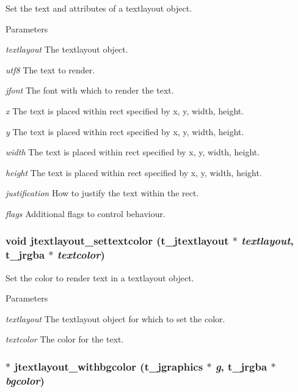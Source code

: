 Set the text and attributes of a textlayout object. 
\begin{DoxyParams}{Parameters}
\item[{\em textlayout}]The textlayout object. \item[{\em utf8}]The text to render. \item[{\em jfont}]The font with which to render the text. \item[{\em x}]The text is placed within rect specified by x, y, width, height. \item[{\em y}]The text is placed within rect specified by x, y, width, height. \item[{\em width}]The text is placed within rect specified by x, y, width, height. \item[{\em height}]The text is placed within rect specified by x, y, width, height. \item[{\em justification}]How to justify the text within the rect. \item[{\em flags}]Additional flags to control behaviour. \end{DoxyParams}
\hypertarget{group__textlayout_ga73ef3d6927ae63816be07cd3314db191}{
\subsubsection[{jtextlayout\_\-settextcolor}]{\setlength{\rightskip}{0pt plus 5cm}void jtextlayout\_\-settextcolor ({\bf t\_\-jtextlayout} $\ast$ {\em textlayout}, \/  {\bf t\_\-jrgba} $\ast$ {\em textcolor})}}
\label{group__textlayout_ga73ef3d6927ae63816be07cd3314db191}


Set the color to render text in a textlayout object. 
\begin{DoxyParams}{Parameters}
\item[{\em textlayout}]The textlayout object for which to set the color. \item[{\em textcolor}]The color for the text. \end{DoxyParams}
\hypertarget{group__textlayout_ga97bb1d3ac51e09a5f2c22487a6e170e0}{
\subsubsection[{jtextlayout\_\-withbgcolor}]{$\ast$ jtextlayout\_\-withbgcolor ({\bf t\_\-jgraphics} $\ast$ {\em g}, \/  {\bf t\_\-jrgba} $\ast$ {\em bgcolor})}}
\label{group__textlayout_ga97bb1d3ac51e09a5f2c22487a6e170e0}


